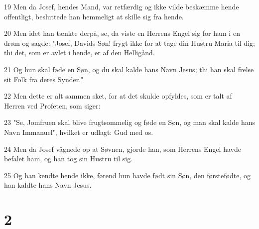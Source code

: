 \par 19 Men da Josef, hendes Mand, var retfærdig og ikke vilde beskæmme hende offentligt, besluttede han hemmeligt at skille sig fra hende.
\par 20 Men idet han tænkte derpå, se, da viste en Herrens Engel sig for ham i en drøm og sagde: "Josef, Davids Søn! frygt ikke for at tage din Hustru Maria til dig; thi det, som er avlet i hende, er af den Helligånd.
\par 21 Og hun skal føde en Søn, og du skal kalde hans Navn Jesus; thi han skal frelse sit Folk fra deres Synder."
\par 22 Men dette er alt sammen sket, for at det skulde opfyldes, som er talt af Herren ved Profeten, som siger:
\par 23 "Se, Jomfruen skal blive frugtsommelig og føde en Søn, og man skal kalde hans Navn Immanuel", hvilket er udlagt: Gud med os.
\par 24 Men da Josef vågnede op at Søvnen, gjorde han, som Herrens Engel havde befalet ham, og han tog sin Hustru til sig.
\par 25 Og han kendte hende ikke, førend hun havde født sin Søn, den førstefødte, og han kaldte hans Navn Jesus.

\chapter{2}

